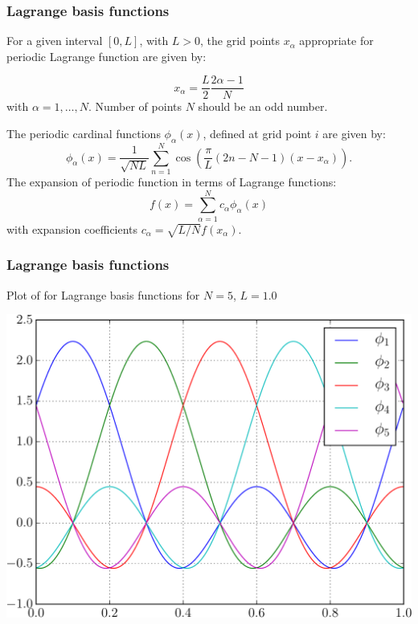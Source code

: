 \documentclass[10pt,t]{beamer}
\begin{document}
\begin{frame}
\frametitle{Lagrange basis functions}

For a given interval $[0,L]$, with $L>0$, the grid points $x_{\alpha}$
appropriate for periodic Lagrange function are given by:

\begin{equation}
x_{\alpha}=\frac{L}{2}\frac{2\alpha-1}{N}
\end{equation}
with $\alpha=1,\ldots,N$. Number of points $N$ should be an odd number.

The periodic cardinal functions $\phi_{\alpha}(x)$, defined
at grid point $i$ are given by:
\begin{equation}
\phi_{\alpha}(x)=\frac{1}{\sqrt{NL}}\sum_{n=1}^{N}\cos\left(\frac{\pi}{L}(2n-N-1)(x-x_{\alpha})\right).
\end{equation}
The expansion of periodic function in terms of Lagrange functions:
\begin{equation}
f(x)=\sum_{\alpha=1}^{N}c_{\alpha}\phi_{\alpha}(x)
\end{equation}
with expansion coefficients $c_{\alpha}=\sqrt{L/N}f(x_{\alpha})$.

\end{frame}


\begin{frame}
\frametitle{Lagrange basis functions}

Plot of for Lagrange basis functions for $N = 5$, $L = 1.0$

{\centering
\includegraphics[scale=0.5]{images/plot_LF_p_N_5.pdf}
\par}

\end{frame}
\end{document}
